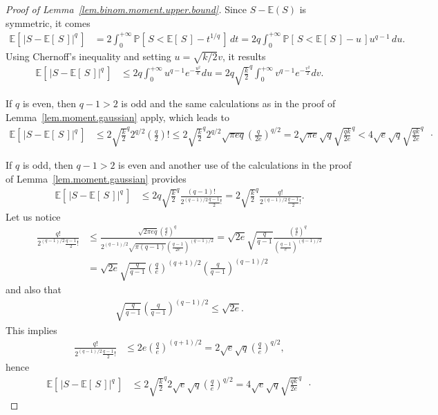 \documentclass[twoside,11pt]{article}
\numberwithin{equation}{section}
\newcommand{\1}{\mathds{1}}%
\newcommand{\paren}[1]{\left( #1 \right)}
\newcommand{\croch}[1]{\left[\, #1 \,\right]}
\newcommand{\abs}[1]{\left\lvert #1 \right\rvert} %
\newcommand{\E}{\mathbb{E}}
\renewcommand{\P}{\mathbb{P}}
\numberwithin{equation}{section}
\theoremstyle{plain}
\begin{document}
\begin{proof}[Proof of Lemma~\ref{lem.binom.moment.upper.bound}]

Since $S-\E(S)$ is symmetric, it comes
\begin{align*}
  \E\croch{ \abs{ S-\E\croch{S} }^q } & = 2 \int_{0}^{+\infty} \P\croch{  S < \E\croch{S} - t^{1/q}  } \, dt =  2 q \int_{0}^{+\infty} \P\croch{  S < \E\croch{S} - u  } u^{q-1}\, du .
\end{align*}
Using Chernoff's inequality and setting $u = \sqrt{k/2} v$, it results
\begin{align*}
  \E\croch{ \abs{ S-\E\croch{S} }^q } & \leq  2 q \int_{0}^{+\infty}  u^{q-1} e^{-\frac{u^2}{k}} du = 2 q \sqrt{\frac{k}{2}}^{q} \int_{0}^{+\infty}  v^{q-1} e^{-\frac{v^2}{2}} dv .
\end{align*}

If $q$ is even, then $q-1>2$ is odd and the same calculations as in the proof of Lemma~\ref{lem.moment.gaussian} apply, which leads to
\begin{align*}
  \E\croch{ \abs{ S-\E\croch{S} }^q } & \leq  2 \sqrt{\frac{k}{2}}^{q} 2^{q/2} \paren{\frac{q}{2}}! \leq 2 \sqrt{\frac{k}{2}}^{q} 2^{q/2} \sqrt{\pi e q } \paren{\frac{q}{2e}}^{q/2} =    2\sqrt{\pi e } \sqrt{q } \sqrt{\frac{qk}{2e}}^{q}  <  4\sqrt{ e } \sqrt{q } \sqrt{\frac{qk}{2e}}^{q} \enspace\cdot
\end{align*}

If $q$ is odd, then $q-1>2$ is even and another use of the calculations in the proof of Lemma~\ref{lem.moment.gaussian}
provides
\begin{align*}
\E\croch{ \abs{ S-\E\croch{S} }^q } & \leq  2 q \sqrt{\frac{k}{2}}^{q}  \frac{(q-1)!}{ 2^{(q-1)/2}\frac{q-1}{2}!} =  2  \sqrt{\frac{k}{2}}^{q}  \frac{q!}{ 2^{(q-1)/2}\frac{q-1}{2}!} .
\end{align*}
Let us notice
\begin{align*}
  \frac{q!}{ 2^{(q-1)/2}\frac{q-1}{2}!} & \leq \frac{ \sqrt{2\pi e q} \paren{\frac{q}{e}}^{q} }{ 2^{(q-1)/2} \sqrt{\pi (q-1)} \paren{\frac{q-1}{2e}}^{(q-1)/2}  } = \sqrt{2e}\sqrt{\frac{q}{q-1}} \frac{ \paren{\frac{q}{e}}^{q} }{ \paren{\frac{q-1}{e}}^{(q-1)/2}  } \\
& = \sqrt{2e} \sqrt{\frac{q}{q-1}} \paren{\frac{q}{e}}^{(q+1)/2}  \paren{ \frac{ q }{q-1} }^{(q-1)/2}
\end{align*}
and also that
\begin{align*}
\sqrt{\frac{q}{q-1}}   \paren{ \frac{ q }{q-1} }^{(q-1)/2} \leq \sqrt{2e} .
\end{align*}
%
This implies
\begin{align*}
  \frac{q!}{ 2^{(q-1)/2}\frac{q-1}{2}!} & \leq
2e \paren{\frac{q}{e}}^{(q+1)/2} = 2\sqrt{e} \sqrt{q} \paren{\frac{q}{e}}^{q/2} ,
\end{align*}
hence
\begin{align*}
\E\croch{ \abs{ S-\E\croch{S} }^q } & \leq  2  \sqrt{\frac{k}{2}}^{q}   2\sqrt{e} \sqrt{q} \paren{\frac{q}{e}}^{q/2} =
4 \sqrt{e} \sqrt{q} \sqrt{\frac{qk}{2e}}^{q}   \enspace \cdot
\end{align*}

\end{proof}
\end{document}

